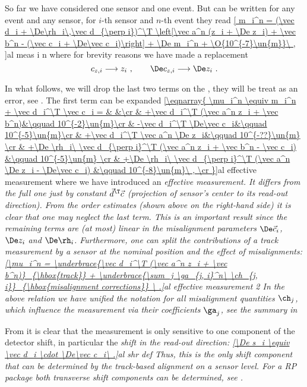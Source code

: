So far we have considered one sensor and one event. But  can be written for any event and any sensor, for $i$-th sensor and $n$-th event they read
\eqref{
m_i^n = (\vec d_i + \De\rh_i\,\vec d_{\perp i})^\T \left[\vec a^n (z_i + \De z_i) + \vec b^n - (\vec c_i + \De\vec c_i)\right] + \De m_i^n + \O{10^{-7}\un{m}}\ ,
}{al meas i n}
where for brevity reasons we have made a replacement
$$c_{z,i} \longrightarrow z_i\ ,\qquad \De c_{z,i} \longrightarrow \De z_i\ .$$

In what follows, we will drop the last two terms on the \rhs, they will be treat as an error, see . The first term can be expanded
\eqref{\eqnarray{
\mu_i^n \equiv m_i^n + \vec d_i^\T \vec c_i = & &\cr
& +\vec d_i^\T (\vec a^n z_i + \vec b^n)&\qquad 10^{-2}\un{m}\cr
& -\vec d_i^\T \De\vec c_i&\qquad 10^{-5}\un{m}\cr
& +\vec d_i^\T \vec a^n \De z_i&\qquad 10^{-??}\un{m} \cr
& +\De \rh_i\ \vec d_{\perp i}^\T (\vec a^n z_i + \vec b^n - \vec c_i) &\qquad 10^{-5}\un{m} \cr
& +\De \rh_i\ \vec d_{\perp i}^\T (\vec a^n \De z_i - \De\vec c_i) &\qquad 10^{-8}\un{m}\ , \cr
}}{al effective measurement}
where we have introduced an \em{effective measurement}. It differs from the full one just by constant $\vec d^\T \vec c$ (projection of sensor's center to its read-out direction). From the order estimates (shown above on the right-hand side) it is clear that one may neglect the last term. This is an important result since the remaining terms are (at most) linear in the misalignment parameters $\De \vec c_i$, $\De z_i$ and $\De \rh_i$. Furthermore, one can split the contributions of a track measurement by a sensor at the nominal position and the effect of misalignments:
\eqref{\mu_i^n =
\underbrace{\vec d_i^\T (\vec a^n z_i + \vec b^n)}_{\hbox{track}}
+
\underbrace{\sum_j \ga_{j, i}^n\ \ch_{j, i}}_{\hbox{misalignment corrections}}
\ .}{al effective measurement 2}
In the above relation we have unified the notation for all misalignment quantities $\ch_j$, which influence the measurement via their coefficients $\ga_j$, see the summary in 


From  it is clear that the measurement is only sensitive to one component of the detector shift, in particular the \em{shift in the read-out direction}:
\eqref{\De s_i \equiv \vec d_i \cdot \De\vec c_i\ .}{al shr def}
Thus, this is the only shift component that can be determined by the track-based alignment on a sensor level. For a RP package both transverse shift components can be determined, see .



